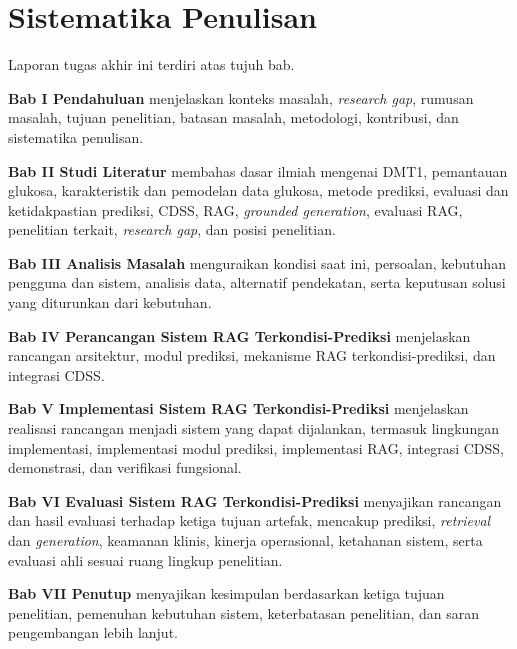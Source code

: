 \section{Sistematika Penulisan}
\label{sec:bab1-sistematika}

Laporan tugas akhir ini terdiri atas tujuh bab.

\textbf{Bab I Pendahuluan} menjelaskan konteks masalah, \textit{research gap}, rumusan masalah, tujuan penelitian, batasan masalah, metodologi, kontribusi, dan sistematika 
penulisan.

\textbf{Bab II Studi Literatur} membahas dasar ilmiah mengenai DMT1, pemantauan glukosa, karakteristik dan pemodelan data glukosa, metode prediksi, evaluasi dan ketidakpastian 
prediksi, CDSS, RAG, \textit{grounded generation}, evaluasi RAG, penelitian terkait, \textit{research gap}, dan posisi penelitian.

\textbf{Bab III Analisis Masalah} menguraikan kondisi saat ini, persoalan, kebutuhan pengguna dan sistem, analisis data, alternatif pendekatan, serta keputusan solusi yang 
diturunkan dari kebutuhan.

\textbf{Bab IV Perancangan Sistem RAG Terkondisi-Prediksi} menjelaskan rancangan arsitektur, modul prediksi, mekanisme RAG terkondisi-prediksi, dan integrasi CDSS.

\textbf{Bab V Implementasi Sistem RAG Terkondisi-Prediksi} menjelaskan realisasi rancangan menjadi sistem yang dapat dijalankan, termasuk lingkungan implementasi, implementasi modul prediksi, 
implementasi RAG, integrasi CDSS, demonstrasi, dan verifikasi fungsional.

\textbf{Bab VI Evaluasi Sistem RAG Terkondisi-Prediksi} menyajikan rancangan dan hasil evaluasi terhadap ketiga tujuan artefak, mencakup prediksi, \textit{retrieval} dan \textit{generation}, keamanan
klinis, kinerja operasional, ketahanan sistem, serta evaluasi ahli sesuai ruang lingkup penelitian.

\textbf{Bab VII Penutup} menyajikan kesimpulan berdasarkan ketiga tujuan penelitian, pemenuhan kebutuhan sistem, keterbatasan penelitian, dan saran pengembangan lebih lanjut.